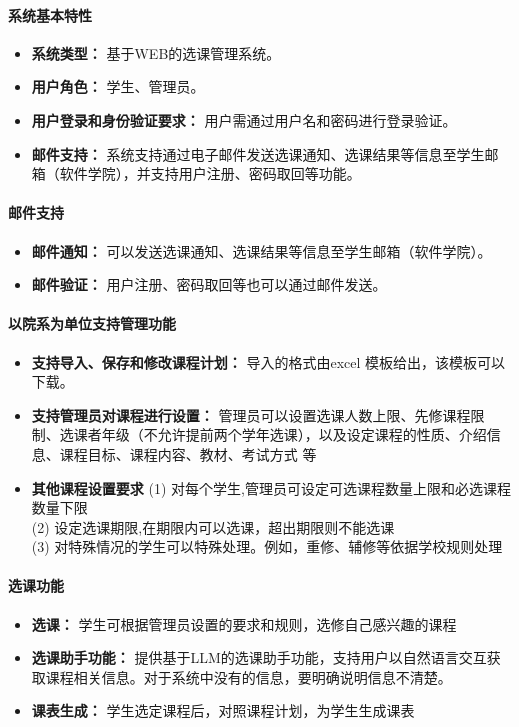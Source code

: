 \documentclass{article}
\begin{document}
\paragraph{系统基本特性}
\begin{itemize}
	\item \textbf{系统类型：} 基于WEB的选课管理系统。
	\item \textbf{用户角色：} 学生、管理员。
	\item \textbf{用户登录和身份验证要求：} 用户需通过用户名和密码进行登录验证。
	\item \textbf{邮件支持：} 系统支持通过电子邮件发送选课通知、选课结果等信息至学生邮箱（软件学院），并支持用户注册、密码取回等功能。
\end{itemize}

\paragraph{邮件支持}
\begin{itemize}
	\item \textbf{邮件通知：} 可以发送选课通知、选课结果等信息至学生邮箱（软件学院）。
	\item \textbf{邮件验证：} 用户注册、密码取回等也可以通过邮件发送。
\end{itemize}

\paragraph{以院系为单位支持管理功能}
\begin{itemize}
	\item \textbf{支持导入、保存和修改课程计划：} 导入的格式由excel 模板给出，该模板可以下载。
	\item \textbf{支持管理员对课程进行设置：} 管理员可以设置选课人数上限、先修课程限制、选课者年级（不允许提前两个学年选课），以及设定课程的性质、介绍信息、课程目标、课程内容、教材、考试方式 等
	\item \textbf{其他课程设置要求}
	(1) 对每个学生,管理员可设定可选课程数量上限和必选课程数量下限\\
	(2) 设定选课期限,在期限内可以选课，超出期限则不能选课\\
	(3) 对特殊情况的学生可以特殊处理。例如，重修、辅修等依据学校规则处理\\
\end{itemize}

\paragraph{选课功能}
\begin{itemize}
	\item \textbf{选课：} 学生可根据管理员设置的要求和规则，选修自己感兴趣的课程
	\item \textbf{选课助手功能：} 提供基于LLM的选课助手功能，支持用户以自然语言交互获取课程相关信息。对于系统中没有的信息，要明确说明信息不清楚。
	\item \textbf{课表生成：} 学生选定课程后，对照课程计划，为学生生成课表
\end{itemize}
\end{document}
